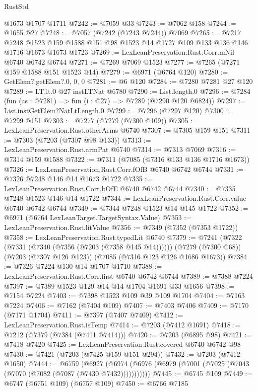 \begin{lexlean}{RustStd}
\begin{coremodule}
    @1673
    @1707
    @1711
@7242 := @7059 @33
@7243 := @7062 @158
@7244 := @1655 @27
@7248 := @7057 (@7242 (@7243 @7244)) @7069
@7265 := @7217
    @7248
    @1523
    @159
    @1588
    @151
    @98
    @1523
    @14
    @1727
    @109
    @133
    @136
    @146
    @1716
    @1673
    @1673
    @1723
@7269 := LexLeanPreservation.Rust.Corr.mNil @6740 @6742 @6744
@7271 := @7269 @7069 @1523
@7277 := @7265 (@7271 @159 @1588 @151 @1523 @14)
@7279 := @6971 (@6764 @120)
@7280 := GetElem?.getElem?.{0, 0, 0}
@7281 := @6 @120
@7284 := @7280 @7281 @27 @120
@7289 := LT.lt.{0} @27 instLTNat @6780
@7290 := List.length.{0}
@7296 := @7284 (fun (as : @7281) => fun (i : @27) => @7289 (@7290 @120 @6824))
@7297 := List.instGetElem?NatLtLength.{0}
@7299 := @7296 (@7297 @120)
@7300 := @7299 @151
@7303 := @7277 (@7279 (@7300 @109))
@7305 := LexLeanPreservation.Rust.otherArms @6740
@7307 := @7305 @159 @151
@7311 := @7303 (@7203 (@7307 @98 @133))
@7313 := LexLeanPreservation.Rust.armPat @6740
@7314 := @7313 @7069
@7316 := @7314 @159 @1588
@7322 := @7311 (@7085 (@7316 @133 @136 @1716 @1673))
@7326 := LexLeanPreservation.Rust.Corr.fOfB @6740 @6742 @6744
@7331 := @7326 @7248 @146 @14 @1673 @1722
@7335 := LexLeanPreservation.Rust.Corr.bOfE @6740 @6742 @6744
@7340 := @7335 @7248 @1523 @146 @14 @1722
@7344 := LexLeanPreservation.Rust.Corr.value @6740 @6742 @6744
@7349 := @7344 @7248 @1523 @14 @145 @1722
@7352 := @6971 (@6764 LexLeanTarget.TargetSyntax.Value)
@7353 := LexLeanPreservation.Rust.litValue
@7356 := @7349 (@7352 (@7353 @1722))
@7358 := LexLeanPreservation.Rust.typedLit @6740
@7379 := @7241
    (@7322 (@7331 (@7340 (@7356 (@7203 (@7358 @145 @14))))))
    (@7279 (@7300 @68))
    (@7203 (@7307 @126 @123))
    (@7085 (@7316 @123 @126 @1686 @1673))
@7384 := @7326 @7224 @130 @14 @1707 @1710
@7388 := LexLeanPreservation.Rust.Corr.first @6740 @6742 @6744
@7389 := @7388 @7224
@7397 := @7389 @1523 @129 @14 @14 @1704 @1691 @33 @1656
@7398 := @7154 @7224
@7403 := @7398 @1523 @109 @39 @109 @1704
@7404 := @7163 @7224
@7406 := @7162 (@7404 @109)
@7407 := @7403 @7406
@7409 := @7170 (@7171 @1704)
@7411 := @7397 (@7407 @7409)
@7412 := LexLeanPreservation.Rust.isTemp
@7414 := @7203 (@7412 @1691)
@7418 := @7212 (@7379 (@7384 (@7411 @7414)))
@7420 := @7203 (@6895 @98)
@7421 := @7418 @7420
@7425 := LexLeanPreservation.Rust.covered @6740 @6742 @98
@7430 := @7421 (@7203 (@7425 @159 @151 @294))
@7432 := @7203 (@7412 @1650)
@7444 := @6759
    (@6927 (@6974 (@6976 (@6979 (@7001 (@7025 (@7043 (@7070 (@7082 (@7087 (@7430 @7432)))))))))))
@7445 := @6745 @109
@7449 := @6747 (@6751 @109) (@6757 @109)
@7450 := @6766 @7185

\end{coremodule}
\end{lexlean}
